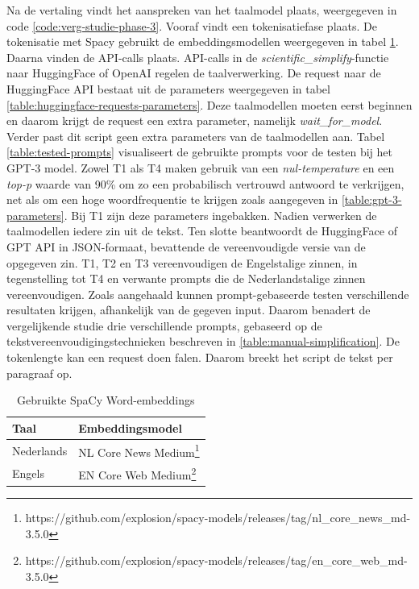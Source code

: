 Na de vertaling vindt het aanspreken van het taalmodel plaats, weergegeven in code \ref{code:verg-studie-phase-3}. Vooraf vindt een tokenisatiefase plaats. De tokenisatie met Spacy gebruikt de embeddingsmodellen weergegeven in tabel \ref{table:wordembeddings-spacy}. Daarna vinden de API-calls plaats. API-calls in de \textit{scientific\_simplify}-functie naar HuggingFace of OpenAI regelen de taalverwerking. De request naar de HuggingFace API bestaat uit de parameters weergegeven in tabel \ref{table:huggingface-requests-parameters}. Deze taalmodellen moeten eerst beginnen en daarom krijgt de request een extra parameter, namelijk \textit{wait\_for\_model}. Verder past dit script geen extra parameters van de taalmodellen aan. Tabel \ref{table:tested-prompts} visualiseert de gebruikte prompts voor de testen bij het GPT-3 model. Zowel T1 als T4 maken gebruik van een \textit{nul-temperature} en een \textit{top-p} waarde van 90\% om zo een probabilisch vertrouwd antwoord te verkrijgen, net als om een hoge woordfrequentie te krijgen zoals aangegeven in \ref{table:gpt-3-parameters}. Bij T1 zijn deze parameters ingebakken. Nadien verwerken de taalmodellen iedere zin uit de tekst. Ten slotte beantwoordt de HuggingFace of GPT API in JSON-formaat, bevattende de vereenvoudigde versie van de opgegeven zin. T1, T2 en T3 vereenvoudigen de Engelstalige zinnen, in tegenstelling tot T4 en verwante prompts die de Nederlandstalige zinnen vereenvoudigen. Zoals aangehaald kunnen prompt-gebaseerde testen verschillende resultaten krijgen, afhankelijk van de gegeven input. Daarom benadert de vergelijkende studie drie verschillende prompts, gebaseerd op de tekstvereenvoudigingstechnieken beschreven in \ref{table:manual-simplification}. De tokenlengte kan een request doen falen. Daarom breekt het script de tekst per paragraaf op. 


\begin{center}
	\begin{table}[H]
		\begin{tabular}{ | m{4cm} | m{12cm} | } 
			\hline
			\textbf{Taal} & \textbf{Embeddingsmodel} \\
			\hline
			Nederlands & NL Core News Medium\footnote{https://github.com/explosion/spacy-models/releases/tag/nl\_core\_news\_md-3.5.0} \\ 
			\hline
			Engels & EN Core Web Medium\footnote{https://github.com/explosion/spacy-models/releases/tag/en\_core\_web\_md-3.5.0} \\
			\hline
		\end{tabular}
		\caption{Gebruikte SpaCy Word-embeddings}
		\label{table:wordembeddings-spacy}
	\end{table}
\end{center}

